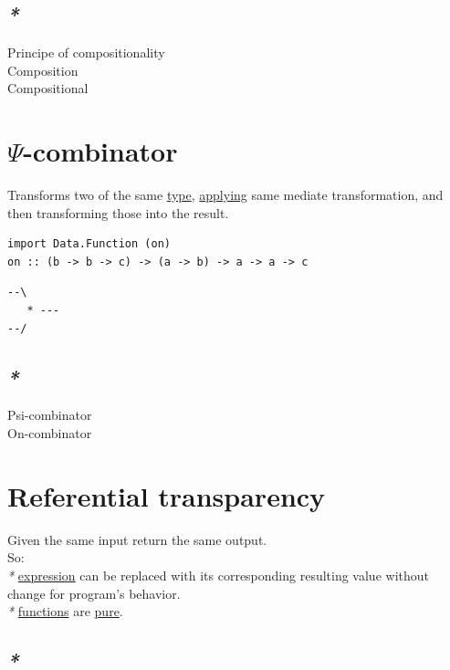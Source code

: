 \documentclass[a4paper,14pt,oneside]{book}
\begin{document}
\section{\emph{*}}
\label{sec:orgf03b5e9}

\label{org00e16e0}Principe of compositionality\\
\label{orgba2ba9c}Composition\\
\label{orgd92e46d}Compositional\\

\chapter{\label{org518d475}\(\Psi\)-combinator}
\label{sec:org98412f4}
Transforms two of the same \hyperref[org258d25a]{type}, \hyperref[org2613141]{applying} same mediate transformation, and then transforming those into the result.\\
\begin{verbatim}
import Data.Function (on)
on :: (b -> b -> c) -> (a -> b) -> a -> a -> c
\end{verbatim}

\begin{verbatim}
--\
   * ---
--/
\end{verbatim}

\section{\emph{*}}
\label{sec:orgf93f465}

\label{org402e3f9}Psi-combinator\\
\label{org01a1d7e}On-combinator\\

\chapter{\label{org259d5d2}Referential transparency}
\label{sec:orgda88fc6}
Given the same input return the same output.\\
So:\\
\emph{*} \hyperref[org70841e3]{expression} can be replaced with its corresponding resulting value without change for program's behavior.\\
\emph{*} \hyperref[orgad455e4]{functions} are \hyperref[org654e12d]{pure}.\\

\section{\emph{*}}
\label{sec:org850a3fa}
\end{document}
